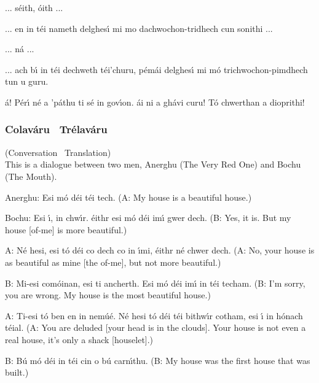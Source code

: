 \begin{leftbubbles}... s\'{e}ith, \'{o}ith ...\end{leftbubbles}
\begin{rightbubbles}... en in t\'{e}i nameth delghes\'{\i} mi mo dachwochon-tridhech cun sonithi ...\end{rightbubbles}
\begin{leftbubbles}... n\'{a} ...\end{leftbubbles}
\begin{rightbubbles}... ach b\'{\i} in t\'{e}i dechweth t\'{e}i'churu, p\'{e}m\'{a}i delghes\'{\i} mi m\'{o} trichwochon-pimdhech tun u guru.\end{rightbubbles}
\begin{leftbubbles}\'{a}! P\'{e}r\'{\i} n\'{e} a 'p\'{a}thu ti s\'{e} in gov\'{\i}on. \'{a}i ni a gh\'{a}vi curu! T\'{o} chwerthan a dioprithi!\end{leftbubbles}
\endgroup

\newpage
\subsubsection{Colav\'{a}ru \textendash\ Tr\'{e}lav\'{a}ru}
(Conversation \textendash\ Translation)\\

This is a dialogue between two men, Anerghu (The Very Red One) and Bochu (The Mouth).

Anerghu: Esi m\'{o} d\'{e}i t\'{e}i tech.
(A: My house is a beautiful house.)

Bochu: Esi \'{\i}, in chw\'{\i}r. \'{e}ithr esi m\'{o} d\'{e}i im\'{\i} gwer dech.
(B: Yes, it is. But my house [of-me] is more beautiful.)

A: N\'{e} hesi, esi t\'{o} d\'{e}i co dech co in \'{\i}mi, \'{e}ithr n\'{e} chwer dech.
(A: No, your house is as beautiful as mine [the of-me], but not more beautiful.)

B: Mi-esi com\'{o}inan, esi ti ancherth. Esi m\'{o} d\'{e}i im\'{\i} in t\'{e}i techam.
(B: I'm sorry, you are wrong. My house is the most beautiful house.)

A: Ti-esi t\'{o} ben en in nem\'{u}\'{e}. N\'{e} hesi t\'{o} d\'{e}i t\'{e}i bithw\'{\i}r cotham, esi \'{\i} in h\'{o}nach t\'{e}ial.
(A: You are deluded [your head is in the clouds]. Your house is not even a real house, it's only a shack [houselet].)

B: B\'{u} m\'{o} d\'{e}i in t\'{e}i cin o b\'{u} carn\'{\i}thu.
(B: My house was the first house that was built.)

